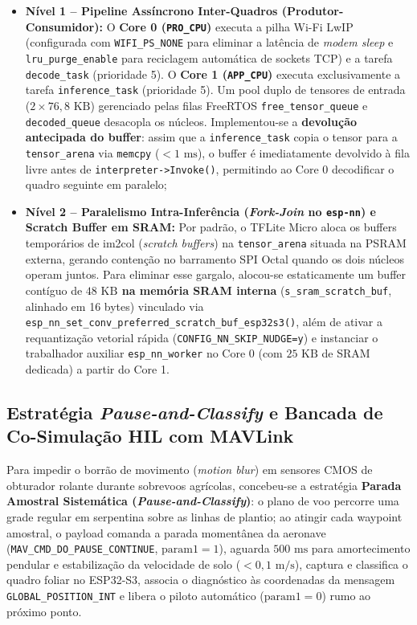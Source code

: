 \documentclass[12pt]{article}
\begin{document}
\begin{itemize}
    \item \textbf{Nível 1 -- Pipeline Assíncrono Inter-Quadros (Produtor-Consumidor):} O \textbf{Core 0 (\texttt{PRO\_CPU})} executa a pilha Wi-Fi LwIP (configurada com \texttt{WIFI\_PS\_NONE} para eliminar a latência de \textit{modem sleep} e \texttt{lru\_purge\_enable} para reciclagem automática de sockets TCP) e a tarefa \texttt{decode\_task} (prioridade 5). O \textbf{Core 1 (\texttt{APP\_CPU})} executa exclusivamente a tarefa \texttt{inference\_task} (prioridade 5). Um pool duplo de tensores de entrada ($2 \times 76,8\text{ KB}$) gerenciado pelas filas FreeRTOS \texttt{free\_tensor\_queue} e \texttt{decoded\_queue} desacopla os núcleos. Implementou-se a \textbf{devolução antecipada do buffer}: assim que a \texttt{inference\_task} copia o tensor para a \texttt{tensor\_arena} via \texttt{memcpy} ($<1\text{ ms}$), o buffer é imediatamente devolvido à fila livre antes de \texttt{interpreter->Invoke()}, permitindo ao Core 0 decodificar o quadro seguinte em paralelo;
    \item \textbf{Nível 2 -- Paralelismo Intra-Inferência (\textit{Fork-Join} no \texttt{esp-nn}) e Scratch Buffer em SRAM:} Por padrão, o TFLite Micro aloca os buffers temporários de im2col (\textit{scratch buffers}) na \texttt{tensor\_arena} situada na PSRAM externa, gerando contenção no barramento SPI Octal quando os dois núcleos operam juntos. Para eliminar esse gargalo, alocou-se estaticamente um buffer contíguo de \textbf{$48\text{ KB}$ na memória SRAM interna} (\texttt{s\_sram\_scratch\_buf}, alinhado em 16 bytes) vinculado via \texttt{esp\_nn\_set\_conv\_preferred\_scratch\_buf\_esp32s3()}, além de ativar a requantização vetorial rápida (\texttt{CONFIG\_NN\_SKIP\_NUDGE=y}) e instanciar o trabalhador auxiliar \texttt{esp\_nn\_worker} no Core 0 (com $25\text{ KB}$ de SRAM dedicada) a partir do Core 1.
\end{itemize}

\subsection{Estratégia \textit{Pause-and-Classify} e Bancada de Co-Simulação HIL com MAVLink}

Para impedir o borrão de movimento (\textit{motion blur}) em sensores CMOS de obturador rolante durante sobrevoos agrícolas, concebeu-se a estratégia \textbf{Parada Amostral Sistemática (\textit{Pause-and-Classify})}: o plano de voo percorre uma grade regular em serpentina sobre as linhas de plantio; ao atingir cada waypoint amostral, o payload comanda a parada momentânea da aeronave (\texttt{MAV\_CMD\_DO\_PAUSE\_CONTINUE}, $\text{param1}=1$), aguarda $500\text{ ms}$ para amortecimento pendular e estabilização da velocidade de solo ($<0,1\text{ m/s}$), captura e classifica o quadro foliar no ESP32-S3, associa o diagnóstico às coordenadas da mensagem \texttt{GLOBAL\_POSITION\_INT} e libera o piloto automático ($\text{param1}=0$) rumo ao próximo ponto.
\end{document}
